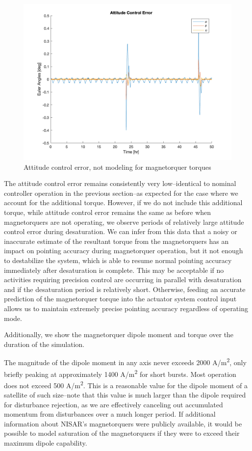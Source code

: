 \begin{figure}[H]
\centering
\includegraphics[scale=0.3]{Images/ps10_error_open_loop.png}
\caption{Attitude control error, not modeling for magnetorquer torques}
\label{fig:ps10_error_open_loop}
\end{figure}

The attitude control error remains consistently very low–identical to nominal controller operation in the previous section–as expected for the case where we account for the additional torque. However, if we do not include this additional torque, while attitude control error remains the same as before when magnetorquers are not operating, we observe periods of relatively large attitude control error during desaturation. We can infer from this data that a noisy or inaccurate estimate of the resultant torque from the magnetorquers has an impact on pointing accuracy during magnetorquer operation, but it not enough to destabilize the system, which is able to resume normal pointing accuracy immediately after desaturation is complete. This may be acceptable if no activities requiring precision control are occurring in parallel with desaturation and if the desaturation period is relatively short. Otherwise, feeding an accurate prediction of the magnetorquer torque into the actuator system control input allows us to maintain extremely precise pointing accuracy regardless of operating mode.

Additionally, we show the magnetorquer dipole moment and torque over the duration of the simulation.

The magnitude of the dipole moment in any axis never exceeds 2000 A/m\textsuperscript{2}, only briefly peaking at approximately 1400 A/m\textsuperscript{2} for short bursts. Most operation does not exceed 500 A/m\textsuperscript{2}. This is a reasonable value for the dipole moment of a satellite of such size–note that this value is much larger than the dipole required for disturbance rejection, as we are effectively canceling out accumulated momentum from disturbances over a much longer period. If additional information about NISAR's magnetorquers were publicly available, it would be possible to model saturation of the magnetorquers if they were to exceed their maximum dipole capability.